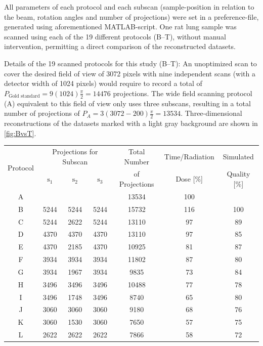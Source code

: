 All parameters of each protocol and each subscan (sample-position in relation to the beam, rotation angles and number of projections) were set in a preference-file, generated using aforementioned MATLAB-script. One rat lung sample was scanned using each of the 19 different protocols (B--T), without manual intervention, permitting a direct comparison of the reconstructed datasets.

\begin{threeparttable}
	\caption[Details of the 19 scanned protocols]{Details of the 19 scanned protocols for this study (B--T): An unoptimized scan to cover the desired field of view of 3072 pixels with nine independent scans (with a detector width of 1024 pixels) would require to record a total of $P_{\textrm{Gold standard}}=9(1024)\frac{\pi}{2}=14476$ projections. The wide field scanning protocol (A) equivalent to this field of view only uses three subscans, resulting in a total number of projections of $P_{A} = 3(3072-200)\frac{\pi}{2}= 13534$. Three-dimensional reconstructions of the datasets marked with a light gray background are shown in \autoref{fig:BvsT}.}
	\label{tab:protocols}
	\begin{tabular}{ccccccc}
		\toprule
		\multirow{2}{*}{Protocol} & \multicolumn{3}{c}{Projections for Subscan} & Total Number & Time/Radiation & Simulated\\
			& $\textrm{s}_{1}$ & $\textrm{s}_{2}$ & $\textrm{s}_{3}$        & of Projections & Dose [\%] & Quality [\%]\\
		\midrule
		A\tnote{1} & & & & 13534 & 100 & \\
		\rowcolor{lightgray} B\tnote{2} & 5244 & 5244 & 5244 & 15732 & 116 & 100\\
		C & 5244 & 2622 & 5244 & 13110 &  97 & 89\\
		D & 4370 & 4370 & 4370 & 13110 &  97 & 85\\
		E & 4370 & 2185 & 4370 & 10925 &  81 & 87\\
		F & 3934 & 3934 & 3934 & 11802 &  87 & 80\\
		G & 3934 & 1967 & 3934 & 9835  &  73 & 84\\
		H & 3496 & 3496 & 3496 & 10488 &  77 & 78\\
		I & 3496 & 1748 & 3496 & 8740  &  65 & 80\\
		J & 3060 & 3060 & 3060 & 9180  &  68 & 76\\
		K & 3060 & 1530 & 3060 & 7650  &  57 & 75\\
		\rowcolor{lightgray} L  & 2622 & 2622 & 2622 & 7866  &  58 & 72\\

\end{tabular}
\end{threeparttable}

